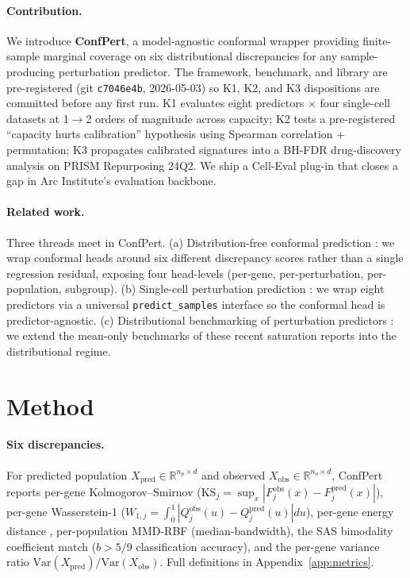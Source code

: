 \documentclass{article}
\begin{document}
\paragraph{Contribution.}
We introduce \textbf{ConfPert}, a model-agnostic conformal wrapper providing finite-sample marginal coverage on six distributional discrepancies for any sample-producing perturbation predictor. The framework, benchmark, and library are pre-registered (git \texttt{c7046e4b}, 2026-05-03) so K1, K2, and K3 dispositions are committed before any first run. K1 evaluates eight predictors $\times$ four single-cell datasets at 1$\to$2 orders of magnitude across capacity; K2 tests a pre-registered ``capacity hurts calibration'' hypothesis using Spearman correlation + permutation; K3 propagates calibrated signatures into a BH-FDR drug-discovery analysis on PRISM Repurposing 24Q2. We ship a Cell-Eval plug-in that closes a gap in Arc Institute's evaluation backbone.

\paragraph{Related work.}
Three threads meet in ConfPert. (a) Distribution-free conformal prediction \citep{romano2019, izbicki2022, tibshirani2019, cauchois2021, bates2021, otcp2025, vovk2012}: we wrap conformal heads around six different discrepancy scores rather than a single regression residual, exposing four head-levels (per-gene, per-perturbation, per-population, subgroup). (b) Single-cell perturbation prediction \citep{lotfollahi2019scgen, lotfollahi2023cpa, roohani2024gears, piran2024biolord, bereket2023, cui2024scgpt, adduri2025state}: we wrap eight predictors via a universal \texttt{predict\_samples} interface so the conformal head is predictor-agnostic. (c) Distributional benchmarking of perturbation predictors \citep{ahlmann2025, csendes2025}: we extend the mean-only benchmarks of these recent saturation reports into the distributional regime.

\section{Method}

\paragraph{Six discrepancies.}
For predicted population $X_{\text{pred}} \in \mathbb{R}^{n_p \times d}$ and observed $X_{\text{obs}} \in \mathbb{R}^{n_o \times d}$, ConfPert reports per-gene Kolmogorov--Smirnov ($\mathrm{KS}_j = \sup_x |F^{\text{obs}}_j(x) - F^{\text{pred}}_j(x)|$), per-gene Wasserstein-1 ($W_{1,j} = \int_0^1 |Q^{\text{obs}}_j(u) - Q^{\text{pred}}_j(u)| du$), per-gene energy distance \citep{szekely2013}, per-population MMD-RBF (median-bandwidth), the SAS bimodality coefficient match ($b > 5/9$ classification accuracy), and the per-gene variance ratio $\mathrm{Var}(X_{\text{pred}}) / \mathrm{Var}(X_{\text{obs}})$. Full definitions in Appendix~\ref{app:metrics}.
\end{document}
